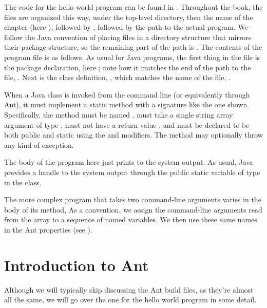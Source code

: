 The code for the hello world program can be found in
.
Throughout the book, the files are organized this way, under the
top-level  directory, then the name of the chapter (here
), followed by , followed by the path to
the actual program.  We follow the Java convention of placing files in
a directory structure that mirrors their package structure, so the
remaining part of the path is
.  The contents of
the  program file is as follows.
%
%
As usual for Java programs, the first thing in the file is the package
declaration, here ; note how it matches
the end of the path to the file, .
Next is the class definition, , which matches the
name of the file, .

When a Java class is invoked from the command line (or equivalently
through Ant), it must implement a static method with a signature like
the one shown.  Specifically, the method must be named ,
must take a single string array argument of type , must
not have a return value , and must be
declared to be both public and static using the
 and  modifiers.  The method may optionally throw
any kind of exception.

The body of the program here just prints  to the
system output.  As usual, Java provides a handle to the system output
through the public static variable  of type
 in the  class.

The more complex program  that takes two
command-line arguments varies in the body of its  method, 
%
%
As a convention, we assign the command-line arguments read
from the array  to a sequence of named variables.  
We then use these same names in the Ant properties (see ).

\section{Introduction to Ant}

Although we will typically skip discussing the Ant build files,
as they're almost all the same, we will go over the one for the
hello world program in some detail.  


